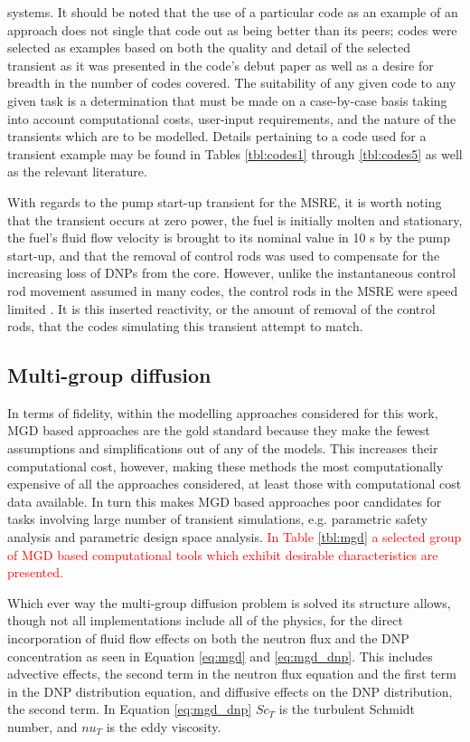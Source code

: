 \documentclass[review]{elsarticle}
\begin{document}
systems.
It should be noted that the use of a particular code as an example of an
approach does not single that code out as being better than its peers; codes
were selected as examples based on both the quality and detail of the selected
transient as it was presented in the code's debut paper as well as
a desire for breadth in the number of codes covered.
 The suitability of any given code to any given task
is a determination that must be made on a case-by-case basis taking into account
computational costs, user-input requirements, and the nature of the transients
which are to be modelled. Details pertaining
to a code used for a transient example may be found in Tables \ref{tbl:codes1}
through \ref{tbl:codes5} as
well as the relevant literature.
\par With regards to the pump start-up transient for the MSRE, it is worth noting
that the transient occurs at zero power, the fuel is initially molten and
stationary, the fuel's fluid flow velocity is brought to its nominal value in
10 s by the pump start-up, and that the removal of control rods was used to
compensate for the increasing loss of DNPs from the core. However, 
unlike the instantaneous control rod movement assumed in many codes, 
the control rods in the
MSRE were speed limited \cite{krepel_dyn3d-msr_2007}. It is this inserted
reactivity, or the amount of removal of the control rods, that the codes simulating
this transient attempt to match.

\subsection{Multi-group diffusion} \label{ssec:mgd}
In terms of fidelity, within the modelling approaches considered for this
work, MGD based approaches are the gold standard because they
make the fewest assumptions and simplifications out of any of the models.
This increases their computational cost, however, making these methods
the most computationally expensive of all the approaches considered, at least
those with computational cost data available. In turn this makes MGD based
approaches poor candidates for tasks involving large number of transient
simulations, e.g. parametric safety analysis and parametric design space
analysis. \textcolor{red}{In Table \ref{tbl:mgd} a selected group of MGD based computational
tools which exhibit desirable characteristics are presented.}
\par Which ever way the multi-group
diffusion problem is solved its structure allows, though not all implementations
include all of the physics, for the direct incorporation
of fluid flow effects on both the neutron flux and the DNP concentration as
seen in Equation \ref{eq:mgd} and \ref{eq:mgd_dnp}.
This includes advective effects, the second term in the neutron flux equation 
 and the first term in the DNP distribution equation, and diffusive effects on
 the DNP distribution, the second term. In Equation \ref{eq:mgd_dnp}
 $Sc_{T}$ is the turbulent Schmidt number, and $nu_{T}$ is the eddy viscosity. 
\end{document}

